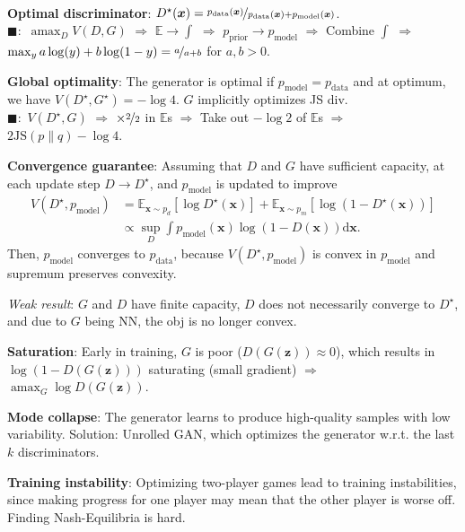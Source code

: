 \documentclass{article}
\DeclareMathOperator*{\argmax}{amax}
\newcommand{\E}{\mathbb{E}}
\renewcommand{\vec}[1]{\bm{#1}}
\newenvironment{topic}[1]
{\textbf{\sffamily \colorbox{black}{\rlap{\textbf{\textcolor{white}{#1}}}\hspace{\linewidth}\hspace{-2\fboxsep}}} \\ \vspace{0.2cm}}
{}
\begin{document}
\begin{multicols*}{2}
\begin{topic}{Generative adversarial network}
        \textbf{Optimal discriminator}: $D^\star(\vec{x}) = \nicefrac{p_{\mathrm{data}}(\vec{x})}{p_{\mathrm{data}}(\vec{x}) + p_{\mathrm{model}}(\vec{x})}$. \\
        $\blacksquare:$ $\argmax_{D} V(D,G)$ $\Rightarrow$ $\E \to \int$ $\Rightarrow$ $p_{\mathrm{prior}} \to p_{\mathrm{model}}$ $\Rightarrow$ Combine $\int$ $\Rightarrow$ $\max_y a \log(y) + b \log(1-y) = \nicefrac{a}{a+b}$ for $a,b > 0$.

        \textbf{Global optimality}: The generator is optimal if $p_{\mathrm{model}} = p_{\mathrm{data}}$ and at optimum, we have $V(D^\star, G^\star) = -\log 4$. $G$ implicitly optimizes JS div. \\
        $\blacksquare:$ $V(D^\star,G)$ $\Rightarrow$ $\times \nicefrac{2}{2}$ in $\E$s $\Rightarrow$ Take
        out $-\log 2$ of $\E$s $\Rightarrow$ $2 \mathrm{JS}(p \| q) - \log 4$.

        \textbf{Convergence guarantee}: Assuming that $D$ and $G$ have sufficient capacity, at each update step $D \to D^\star$, and $p_{\mathrm{model}}$ is updated to improve
        \begin{align*}
            V(D^\star, p_{\mathrm{model}}) & = \E_{\vec{x} \sim p_d} [\log D^\star(\vec{x})] + \E_{\vec{x} \sim p_m} [\log (1 - D^\star(\vec{x}))] \\
                                           & \propto \sup_D \int p_{\mathrm{model}}(\vec{x}) \log (1 - D(\vec{x})) \mathrm{d}\vec{x}.
        \end{align*}
        Then, $p_{\mathrm{model}}$ converges to $p_{\mathrm{data}}$, because $V(D^\star,
            p_{\mathrm{model}})$ is convex in $p_{\mathrm{model}}$ and supremum preserves convexity.

        \textit{Weak result}: $G$ and $D$ have finite capacity, $D$ does not necessarily converge to $D^\star$, and
        due to $G$ being NN, the obj is no longer convex.

        \textbf{Saturation}: Early in training, $G$ is poor ($D(G(\vec{z})) \approx 0$), which
        results in $\log (1 - D(G(\vec{z})))$ saturating (small gradient) $\Rightarrow$ $\argmax_G \log D(G(\vec{z}))$.

        \textbf{Mode collapse}: The generator learns to produce high-quality samples with low
        variability. Solution: Unrolled GAN, which optimizes the generator w.r.t. the last $k$
        discriminators.

        \textbf{Training instability}: Optimizing two-player games lead to training instabilities,
        since making progress for one player may mean that the other player is worse off. Finding
        Nash-Equilibria is hard.


\end{topic}
\end{multicols*}
\end{document}
